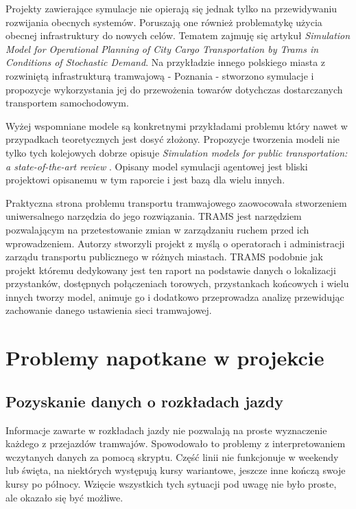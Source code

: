 \documentclass[12pt,a4paper]{article}
\begin{document}
        Projekty zawierające symulacje nie opierają się jednak tylko na przewidywaniu rozwijania obecnych systemów. Poruszają one również problematykę użycia obecnej infrastruktury do nowych celów. Tematem zajmuję się artykuł \textit{Simulation Model for Operational Planning of City Cargo Transportation by Trams in Conditions of Stochastic Demand}\cite{poz_sim}.  Na przykładzie innego polskiego miasta z rozwiniętą infrastrukturą tramwajową - Poznania - stworzono symulacje i propozycje wykorzystania jej do przewożenia towarów dotychczas dostarczanych transportem samochodowym.

        Wyżej wspomniane modele są konkretnymi przykładami problemu który nawet w przypadkach teoretycznych jest dosyć złożony. Propozycje tworzenia modeli nie tylko tych kolejowych dobrze opisuje \textit{Simulation models for public transportation: a state-of-the-art review} \cite{sim_models}. Opisany model symulacji agentowej jest bliski projektowi opisanemu w tym raporcie i jest bazą dla wielu innych.

        Praktyczna strona problemu transportu tramwajowego zaowocowała stworzeniem uniwersalnego narzędzia do jego rozwiązania. TRAMS\cite{TRAMS} jest narzędziem pozwalającym na przetestowanie zmian w zarządzaniu ruchem przed ich wprowadzeniem. Autorzy stworzyli projekt z myślą o operatorach i administracji zarządu transportu publicznego w różnych miastach. TRAMS podobnie jak projekt któremu dedykowany jest ten raport na podstawie danych o lokalizacji przystanków, dostępnych połączeniach torowych, przystankach końcowych i wielu innych tworzy model, animuje go i dodatkowo przeprowadza analizę przewidując zachowanie danego ustawienia sieci tramwajowej.

    \section{Problemy napotkane w projekcie}
        \subsection{Pozyskanie danych o rozkładach jazdy}
            Informacje zawarte w rozkładach jazdy nie pozwalają na proste wyznaczenie każdego z przejazdów tramwajów. Spowodowało to problemy z interpretowaniem wczytanych danych za pomocą skryptu. Część linii nie funkcjonuje w weekendy lub święta, na niektórych występują kursy wariantowe, jeszcze inne kończą swoje kursy po północy. Wzięcie wszystkich tych sytuacji pod uwagę nie było proste, ale okazało się być możliwe.
\end{document}
